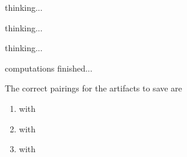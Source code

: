 \documentclass[white]{guildcamp3}
\begin{document}
\name{\wEndWorldOne{}} %

thinking...

thinking...

thinking...

computations finished...

The correct pairings for the artifacts to save \bTechWorld{} are

\begin{enumerate}
	\item \iMagicArtifactOne{} with \iTechArtifactOne{}

	\item \iMagicArtifactTwo{} with \iTechArtifactTwo{}

	\item \iMagicArtifactThree{} with \iTechArtifactThree{}
\end{enumerate}

\end{document}
